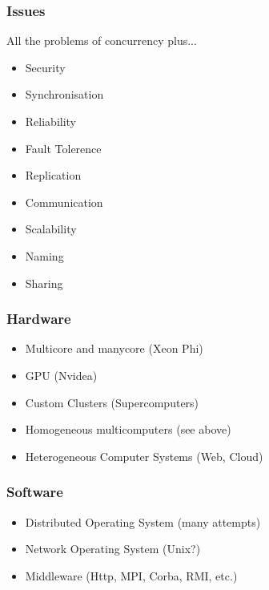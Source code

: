 \documentclass{beamer}
\begin{document}
  \begin{frame}
  	\frametitle{Issues}
  	All the problems of concurrency plus...
  	\begin{itemize}
  		\item Security
  		\item Synchronisation
  		\item Reliability
  		\item Fault Tolerence
  		\item Replication
  		\item Communication
  		\item Scalability
  		\item Naming
  		\item Sharing
  	\end{itemize}
  \end{frame}
    \begin{frame}
    	\frametitle{Hardware}
    	\begin{itemize}
    		\item Multicore and manycore (Xeon Phi)
    		\item GPU (Nvidea)
    		\item Custom Clusters (Supercomputers)
    		\item Homogeneous multicomputers (see above)
    		\item Heterogeneous Computer Systems (Web, Cloud)
    	\end{itemize}
    \end{frame}
      \begin{frame}
      	\frametitle{Software}
      	\begin{itemize}
      		\item Distributed Operating System (many attempts)
      		\item Network Operating System (Unix?)
      		\item Middleware (Http, MPI, Corba, RMI, etc.)
      	\end{itemize}
      \end{frame}
\end{document}
